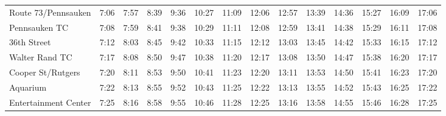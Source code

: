 \begin{center}
\begin{tabular}{@{}lrrrrrrrrrrrrr@{}}
Route 73/Pennsauken & 7:06 & 7:57 & 8:39 & 9:36 & 10:27 & 11:09 & 12:06 & 12:57 & 13:39 & 14:36 & 15:27 & 16:09 & 17:06 \\
Pennsauken TC & 7:08 & 7:59 & 8:41 & 9:38 & 10:29 & 11:11 & 12:08 & 12:59 & 13:41 & 14:38 & 15:29 & 16:11 & 17:08 \\
36th Street & 7:12 & 8:03 & 8:45 & 9:42 & 10:33 & 11:15 & 12:12 & 13:03 & 13:45 & 14:42 & 15:33 & 16:15 & 17:12 \\
Walter Rand TC & 7:17 & 8:08 & 8:50 & 9:47 & 10:38 & 11:20 & 12:17 & 13:08 & 13:50 & 14:47 & 15:38 & 16:20 & 17:17 \\
Cooper St/Rutgers & 7:20 & 8:11 & 8:53 & 9:50 & 10:41 & 11:23 & 12:20 & 13:11 & 13:53 & 14:50 & 15:41 & 16:23 & 17:20 \\
Aquarium & 7:22 & 8:13 & 8:55 & 9:52 & 10:43 & 11:25 & 12:22 & 13:13 & 13:55 & 14:52 & 15:43 & 16:25 & 17:22 \\
Entertainment Center & 7:25 & 8:16 & 8:58 & 9:55 & 10:46 & 11:28 & 12:25 & 13:16 & 13:58 & 14:55 & 15:46 & 16:28 & 17:25 \\
\bottomrule\end{tabular}\end{center}
